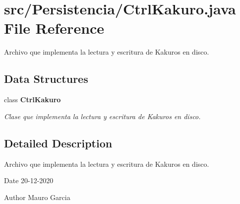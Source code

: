 \section{src/\+Persistencia/\+Ctrl\+Kakuro.java File Reference}
\label{_ctrl_kakuro_8java}


Archivo que implementa la lectura y escritura de Kakuros en disco.  


\subsection*{Data Structures}
\begin{DoxyCompactItemize}
\item 
class \textbf{ Ctrl\+Kakuro}
\begin{DoxyCompactList}\small\item\em Clase que implementa la lectura y escritura de Kakuros en disco. \end{DoxyCompactList}\end{DoxyCompactItemize}


\subsection{Detailed Description}
Archivo que implementa la lectura y escritura de Kakuros en disco. 

\begin{DoxyDate}{Date}
20-\/12-\/2020 
\end{DoxyDate}
\begin{DoxyAuthor}{Author}
Mauro Garcia 
\end{DoxyAuthor}
